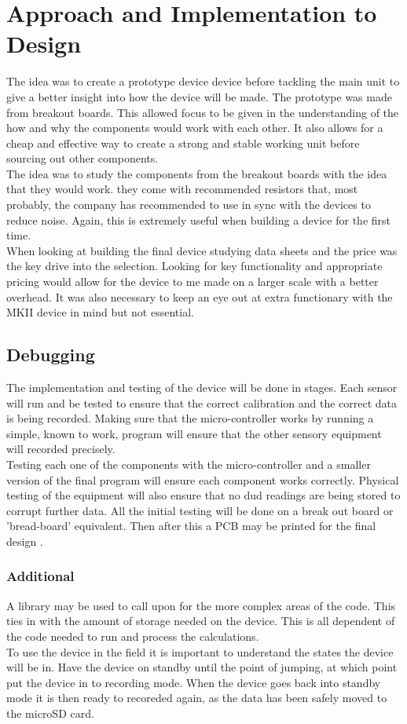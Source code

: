 \documentclass{report}
\begin{document}
\section{Approach and Implementation to Design}
The idea was to create a prototype device device before tackling the main unit to give a better insight into how the device will be made. The prototype was made from breakout boards. This allowed focus to be given in the understanding of the how and why the components would work with each other. It also allows for a cheap and effective way to create a strong and stable working unit before sourcing out other components. \\
The idea was to study the components from the breakout boards with the idea that they would work. they come with recommended resistors that, most probably, the company has recommended to use in sync with the devices to reduce noise. Again, this is extremely useful when building a device for the first time.\\
When looking at building the final device studying data sheets and the price was the key drive into the selection. Looking for key functionality and appropriate pricing would allow for the device to me made on a larger scale with a better overhead. It was also necessary to keep an eye out at extra functionary with the MKII device in mind but not essential.
  
\subsection{Debugging}
The implementation and testing of the device will be done in stages. Each sensor will run and be tested to ensure that the correct calibration and the correct data is being recorded. Making sure that the micro-controller works by running a simple, known to work, program will ensure that the other sensory equipment will recorded precisely. \\
Testing each one of the components with the micro-controller and a smaller version of the final program will ensure each component works correctly. Physical testing of the equipment will also ensure that no dud readings are being stored to corrupt further data. 
All the initial testing will be done on a break out board or 'bread-board' equivalent. Then after this a PCB may be printed for the final design .\\

\subsubsection{Additional}
A library  may be used to call upon for the more complex areas of the code. This ties in with the amount of storage needed on the device. This is all dependent of the code needed to run and process the calculations. \\
To use the device in the field it is important to understand the states the device will be in. Have the device on standby until the point of jumping, at which point put the device in to recording mode. When the device goes back into standby mode it is then ready to recoreded again, as the data has been safely moved to the microSD card. 
  
\end{document}
